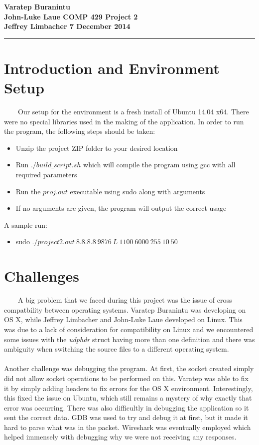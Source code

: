 \documentclass[11pt]{article}
\newcommand{\myname}{Project 2}
\newcommand{\course}{COMP 429}
\newcommand{\assignment}{Varatep Buranintu\\John-Luke Laue}
\newcommand{\probs}{Jeffrey Limbacher}
\newcommand{\duedate}{7 December 2014}
\newcommand{\mytitle}{
\begin{flushleft}
\bfseries
\assignment       \hspace*{\fill} \course \hspace*{\fill} \myname\\
\probs    \hspace*{\fill}                                 \duedate\\
\rule[10pt]{\linewidth}{1pt}
\end{flushleft}
}
\begin{document}
\thispagestyle{empty}   %
\mytitle                

\renewcommand{\qedsymbol}{}

\section{Introduction and Environment Setup}
\ \ \ \ Our setup for the environment is a fresh install of Ubuntu 14.04 x64. There were no special libraries used in the making of the application. In order to run the program, the following steps should be taken:\begin{itemize}
\item Unzip the project ZIP folder to your desired location
\item Run $./build\_script.sh$ which will compile the program using gcc with all required parameters
\item Run the $proj.out$ executable using sudo along with arguments
\item If no arguments are given, the program will output the correct usage
\end{itemize}
A sample run:
\begin{itemize}
\item sudo $./project2.out\ 8.8.8.8\ 9876\ L\ 1100\ 6000\ 255\ 10\ 50$
\end{itemize}

\section{Challenges}
\ \ \ \ A big problem that we faced during this project was the issue of cross compatbility between operating systems. Varatep Buranintu was developing on OS X, while Jeffrey Limbacher and John-Luke Laue developed on Linux. This was due to a lack of consideration for compatibility on Linux and we encountered some issues with the \textit{udphdr} struct having more than one definition and there was ambiguity when switching the source files to a different operating system. 
\paragraph{} Another challenge was debugging the program. At first, the socket created simply did not allow socket operations to be performed on this. Varatep was able to fix it by simply adding headers to fix errors for the OS X environment. Interestingly, this fixed the issue on Ubuntu, which still remains a mystery of why exactly that error was occurring. There was also difficultly in debugging the application so it sent the correct data. GDB was used to try and debug it at first, but it made it hard to parse what was in the packet. Wireshark was eventually employed which helped immensely with debugging why we were not receiving any responses. 
\end{document}
